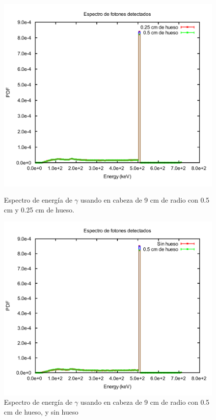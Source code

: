 \documentclass[12pt,a4paper,onecolumn]{article}
\begin{document}
\begin{figure}[h]
	\centering
	\begin{minipage}{0.45\textwidth}
		\centering
		\includegraphics[scale=0.32]{025_05hueso}
		\caption{Espectro de energía de $\gamma$ usando  en cabeza de 9 cm de radio con 0.5 cm y 0.25 cm de hueso.} 
		\label{fig:02505hueso}
	\end{minipage}
	\hspace{2mm}
	\begin{minipage}{0.45\textwidth}
		\centering
		\includegraphics[scale=0.32]{2sinhueso05cmhueso}
		\caption{Espectro de energía de $\gamma$ usando  en cabeza de 9 cm de radio con 0.5 cm de hueso, y sin hueso}
		\label{fig:2sinhueso05cmhueso}  
\end{minipage}	
\end{figure}
\end{document}
